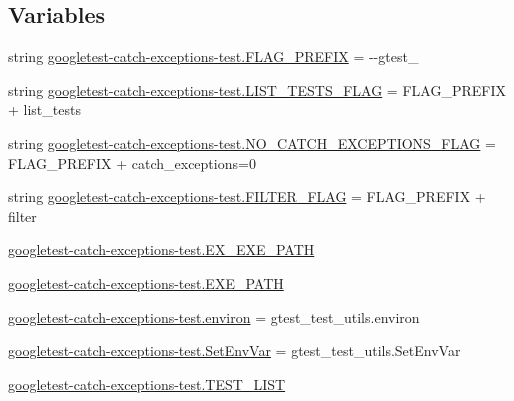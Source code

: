 \subsection*{Variables}
\begin{DoxyCompactItemize}
\item 
string \mbox{\hyperlink{namespacegoogletest-catch-exceptions-test_ab8cc08f04bdda52f24b382ecac3ff310}{googletest-\/catch-\/exceptions-\/test.\+F\+L\+A\+G\+\_\+\+P\+R\+E\+F\+IX}} = \textquotesingle{}-\/-\/gtest\+\_\+\textquotesingle{}
\item 
string \mbox{\hyperlink{namespacegoogletest-catch-exceptions-test_add81248503390e72cfc23683951a1717}{googletest-\/catch-\/exceptions-\/test.\+L\+I\+S\+T\+\_\+\+T\+E\+S\+T\+S\+\_\+\+F\+L\+AG}} = F\+L\+A\+G\+\_\+\+P\+R\+E\+F\+IX + \textquotesingle{}list\+\_\+tests\textquotesingle{}
\item 
string \mbox{\hyperlink{namespacegoogletest-catch-exceptions-test_a6db016858ef7b94b823eb0ea159f4ef0}{googletest-\/catch-\/exceptions-\/test.\+N\+O\+\_\+\+C\+A\+T\+C\+H\+\_\+\+E\+X\+C\+E\+P\+T\+I\+O\+N\+S\+\_\+\+F\+L\+AG}} = F\+L\+A\+G\+\_\+\+P\+R\+E\+F\+IX + \textquotesingle{}catch\+\_\+exceptions=0\textquotesingle{}
\item 
string \mbox{\hyperlink{namespacegoogletest-catch-exceptions-test_a492a71486bad11e49a96d5b1b97cd1b5}{googletest-\/catch-\/exceptions-\/test.\+F\+I\+L\+T\+E\+R\+\_\+\+F\+L\+AG}} = F\+L\+A\+G\+\_\+\+P\+R\+E\+F\+IX + \textquotesingle{}filter\textquotesingle{}
\item 
\mbox{\hyperlink{namespacegoogletest-catch-exceptions-test_a9d4f56b684ab4356faea3b9640072a7a}{googletest-\/catch-\/exceptions-\/test.\+E\+X\+\_\+\+E\+X\+E\+\_\+\+P\+A\+TH}}
\item 
\mbox{\hyperlink{namespacegoogletest-catch-exceptions-test_a188751df0f5c5c09a9cbb394ef711725}{googletest-\/catch-\/exceptions-\/test.\+E\+X\+E\+\_\+\+P\+A\+TH}}
\item 
\mbox{\hyperlink{namespacegoogletest-catch-exceptions-test_ac016f17c70e0883eb6b14abcfaf5da44}{googletest-\/catch-\/exceptions-\/test.\+environ}} = gtest\+\_\+test\+\_\+utils.\+environ
\item 
\mbox{\hyperlink{namespacegoogletest-catch-exceptions-test_aa87a06c3b29e680c311b77240c61d745}{googletest-\/catch-\/exceptions-\/test.\+Set\+Env\+Var}} = gtest\+\_\+test\+\_\+utils.\+Set\+Env\+Var
\item 
\mbox{\hyperlink{namespacegoogletest-catch-exceptions-test_a8002b73eafb58268e677846819651377}{googletest-\/catch-\/exceptions-\/test.\+T\+E\+S\+T\+\_\+\+L\+I\+ST}}

\end{DoxyCompactItemize}
